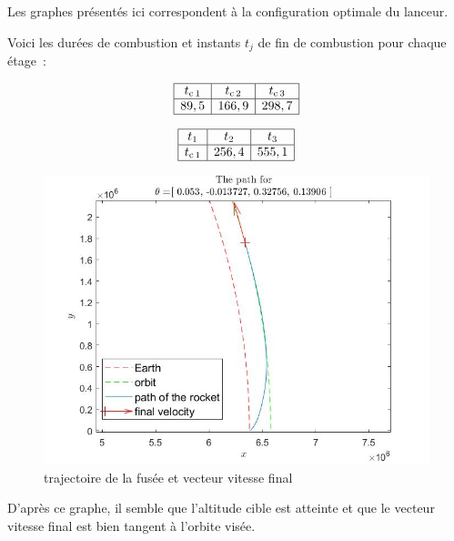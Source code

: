 Les graphes présentés ici correspondent à la configuration optimale du lanceur.

Voici les durées de combustion et instants $t_j$ de fin de combustion pour chaque étage~:

\[\begin{array}{|c|c|c|}\hline
t_{\mathrm{c}\,1} & t_{\mathrm{c}\,2} & t_{\mathrm{c}\,3}\\\hline
89,5 & 166,9 & 298,7\\\hline
\end{array}\]

\[\begin{array}{|c|c|c|}\hline
t_{1} & t_{2} & t_{3}\\\hline
t_{\mathrm{c}\,1} & 256,4 & 555,1\\\hline
\end{array}\]

\clearpage
\begin{center}
\begin{figure}[htbp]
\includegraphics[scale=0.65]{./graphs/path.jpg}
\caption{trajectoire de la fusée et vecteur vitesse final}
\end{figure}
\end{center}

D'après ce graphe, il semble que l'altitude cible est atteinte et que le vecteur vitesse final est bien tangent à l'orbite visée.

